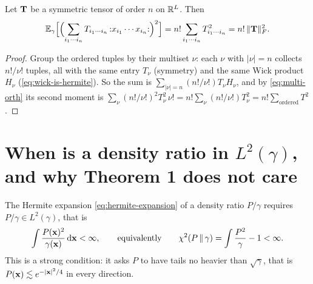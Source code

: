 \begin{lemma}
\label{lem:wick-second-moment}
Let $\mathbf{T}$ be a symmetric tensor of order $n$ on $\mathbb{R}^{L}$. Then
\begin{equation}
  \mathbb{E}_\gamma\Bigl[\Bigl(\sum_{i_1\cdots i_n}T_{i_1\cdots i_n}\,{:}x_{i_1}\cdots x_{i_n}{:}\Bigr)^2\Bigr]
  =n!\sum_{i_1\cdots i_n}T_{i_1\cdots i_n}^2=n!\,\lVert \mathbf{T} \rVert_{F}^2 .
  \label{eq:wick-second-moment}
\end{equation}
\end{lemma}
\begin{proof}
Group the ordered tuples by their multiset $\nu$: each $\nu$ with $|\nu|=n$ collects
$n!/\nu!$ tuples, all with the same entry $T_\nu$ (symmetry) and the same Wick product
$H_\nu$ (\cref{eq:wick-is-hermite}). So the sum is $\sum_{|\nu|=n}(n!/\nu!)T_\nu H_\nu$,
and by \cref{eq:multi-orth} its second moment is
$\sum_\nu(n!/\nu!)^2T_\nu^2\,\nu!=n!\sum_\nu(n!/\nu!)T_\nu^2=n!\sum_{\text{ordered}}T^2$.
\end{proof}


\section{When is a density ratio in $L^2(\gamma)$, and why Theorem 1 does not care}
\label{sec:l2}

The Hermite expansion \cref{eq:hermite-expansion} of a density ratio $P/\gamma$
requires $P/\gamma\in L^2(\gamma)$, that is
\begin{equation}
  \int\frac{P(\mathbf{x})^2}{\gamma(\mathbf{x})}\,\mathrm{d}\mathbf{x}<\infty,
  \qquad\text{equivalently}\qquad \chi^2(P\,\|\,\gamma)=\int\frac{P^2}{\gamma}-1<\infty .
\end{equation}
This is a strong condition: it asks $P$ to have tails no heavier than $\sqrt\gamma$,
that is $P(\mathbf{x})\lesssim e^{-|\mathbf{x}|^2/4}$ in every direction.

